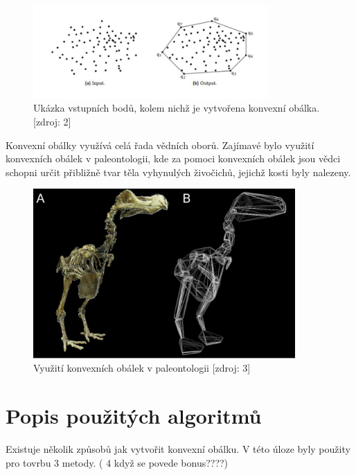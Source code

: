 \documentclass[a4paper, 12pt]{article}
\begin{document}
\begin{figure}[h!]
	\centering
	\includegraphics[width=9cm]{convex_hull.jpg}
	\caption{Ukázka vstupních bodů, kolem nichž je vytvořena konvexní obálka. [zdroj: 2]}
\end{figure}

Konvexní obálky využívá celá řada vědních oborů. Zajímavé bylo využití konvexních obálek v paleontologii, kde za pomoci konvexních obálek jsou vědci schopni určit přibližně tvar těla vyhynulých živočichů, jejichž kosti byly nalezeny. \\

\begin{figure}[h!]
	\centering
	\includegraphics[width=10cm]{paleontology.jpg}
	\caption{Využití konvexních obálek v paleontologii [zdroj: 3]}
\end{figure}


\section{Popis použitých algoritmů}
Existuje několik způsobů jak vytvořit konvexní obálku. V této úloze byly použity pro tovrbu 3 metody. ( 4 když se povede bonus????)
\end{document}
